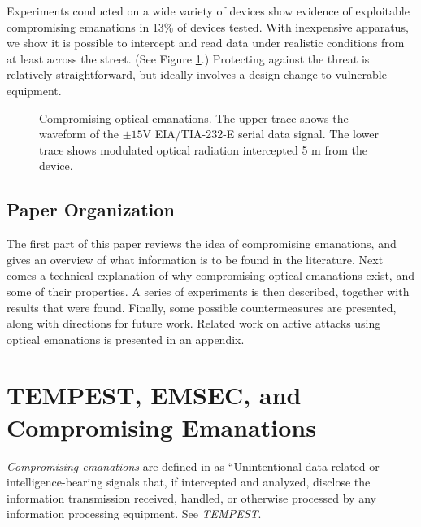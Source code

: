 \documentclass[twocolumn]{article}
\begin{document}
Experiments conducted on a wide variety of devices show evidence of exploitable compromising emanations in 13\% of devices tested.  With inexpensive apparatus, we show it is possible to intercept and read data under realistic conditions from at least across the street.  (See Figure \ref{example_of_optical_emanations_figure}.)  Protecting against the threat is relatively straightforward, but ideally involves a design change to vulnerable equipment.

\begin{figure}[htbp]
\centerline{\epsfysize=1.5in }
\caption{Compromising optical emanations.  The upper trace shows the
waveform of the $\pm15$V EIA/TIA-232-E serial data signal.  The lower
trace shows modulated optical radiation intercepted 5 m from the
device.}
\label{example_of_optical_emanations_figure}
\end{figure}

\subsection{Paper Organization}

The first part of this paper reviews the idea of compromising emanations, and gives an overview of what information is to be found in the literature.  Next comes a technical explanation of why compromising optical emanations exist, and some of their properties.  A series of experiments is then described, together with results that were found.  Finally, some possible countermeasures are presented, along with directions for future work. Related work on active attacks using optical emanations is presented in an appendix.

\section{TEMPEST, EMSEC, and Compromising Emanations}

{\it Compromising emanations} are defined in \cite{ncsc_tg_004} as ``Unintentional data-related or intelligence-bearing signals that, if intercepted and analyzed, disclose the information transmission received, handled, or otherwise processed by any information processing equipment. See {\it TEMPEST}.
\end{document}
